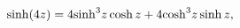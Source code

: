 \[\mathop{\sinh\/}\nolimits\!\left(4z\right)=4{\mathop{\sinh\/}\nolimits^{3}}z%
\mathop{\cosh\/}\nolimits z+4{\mathop{\cosh\/}\nolimits^{3}}z\mathop{\sinh\/}%
\nolimits z,\]